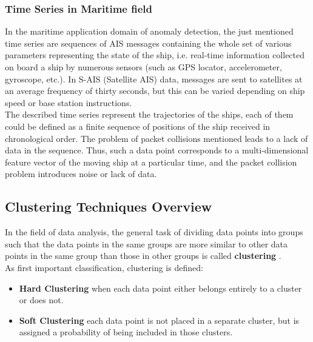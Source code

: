     \subsubsection{Time Series in Maritime field}
    In the maritime application domain of anomaly detection, the just mentioned time series are sequences of AIS messages containing the whole set of various parameters representing the state of the ship, i.e. real-time information collected on board a ship by numerous sensors (such as GPS locator, accelerometer, gyroscope, etc.). 
    In S-AIS (Satellite AIS) data, messages are sent to satellites at an average frequency of thirty seconds, but this can be varied depending on ship speed or base station instructions. 
    \\
    The described time series represent the trajectories of the ships, each of them could be defined as a finite sequence of positions of the ship received in chronological order. The problem of packet collisions mentioned leads to a lack of data in the sequence. Thus, such a data point corresponds to a multi-dimensional feature vector of the moving ship at a particular time, and the packet collision problem introduces noise or lack of data.

    \subsection{Clustering Techniques Overview}
    In the field of data analysis, the general task of dividing data points into groups such that the data points in the same groups are more similar to other data points in the same group than those in other groups is called \textbf{clustering} \cite{clustering}.
    \\
    As first important classification, clustering is defined:
    
    \begin{itemize}
    \item \textbf{Hard Clustering} when each data point either belongs entirely to a cluster or does not.
    \item \textbf{Soft Clustering} each data point is not placed in a separate cluster, but is assigned a probability of being included in those clusters.
    \end{itemize}
    \\
    
